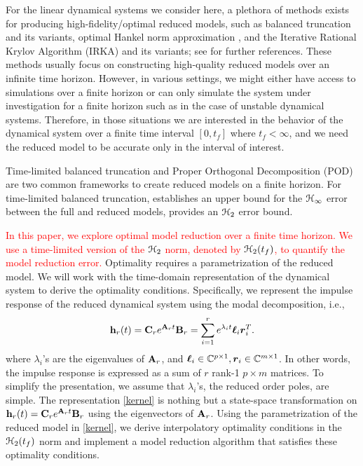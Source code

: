 \documentclass[twocolumn]{autart}
\begin{document}
For the linear dynamical systems we consider here, a plethora of methods exists
for producing high-fidelity/optimal reduced models, such as  balanced truncation \cite{MulR76,Moo81} and its variants, optimal Hankel norm approximation \cite{Glo84}, and the Iterative Rational Krylov Algorithm (IRKA) \cite{GugBA08} and its variants; see \cite{Ant05,BauBF14} for further references.
These methods usually focus on constructing high-quality reduced models  over an infinite time horizon. However, in various settings, we might either have access to simulations over a finite horizon or can only simulate the system under investigation for a finite horizon such as in the case of unstable dynamical systems. Therefore, in those situations we are interested in the behavior of the dynamical system over a finite time interval $[0,t_f]$ where $t_f < \infty$, and we need the reduced model to be accurate only in the interval of interest. 


Time-limited balanced truncation \cite{GawJ90,GugA03,RedK17,Kur17} and Proper Orthogonal Decomposition (POD)   \cite{HolLB96}  are two common frameworks to create reduced models on a finite horizon. 
For time-limited balanced truncation, \cite{GugA03} establishes an upper bound for the $\EuScript{H}_\infty$ error between the full and reduced models,  \cite{RedK17} provides an $\EuScript{H}_2$ error bound. 


  
\textcolor{red}{In this paper,  we explore optimal model reduction over a finite time horizon. We use a time-limited version of the $\EuScript{H}_2$ norm, denoted by $\EuScript{H}_2(t_f)$, to quantify the model reduction error.}
 Optimality requires a parametrization of the reduced model. We will work with the time-domain representation of the dynamical system to derive the optimality conditions. Specifically, we represent the impulse response of the reduced dynamical system using the modal decomposition, i.e.,
 \begin{equation}\label{kernel}
\begin{aligned}
\mathbf{h}_r(t)=\mathbf{C}_r e^{\mathbf{A}_r t}\mathbf{B}_r=\sum_{i=1}^r e^{\lambda_it}\boldsymbol{\ell}_i\boldsymbol{r}_i^T.
\end{aligned}
\end{equation}
where $\lambda_i$'s are the eigenvalues of $\mathbf{A}_r$, and $\boldsymbol{\ell}_i \in \mathbb{C}^{p\times 1}, \boldsymbol{r}_i\in \mathbb{C}^{m\times1}$. 
In other words, the impulse response is expressed as a sum of $r$ rank-1 $p\times m$  matrices.
To simplify the presentation,  we assume  that $\lambda_i$'s, the reduced order poles,  are simple.  The representation \eqref{kernel} 
is nothing but a state-space transformation on $\mathbf{h}_r(t)=\mathbf{C}_r e^{\mathbf{A}_r t}\mathbf{B}_r$ using the eigenvectors of $\mathbf{A}_r$. 
Using the parametrization of the reduced model in \eqref{kernel}, we derive interpolatory optimality conditions in the $\EuScript{H}_2(t_f)$ norm and implement a model reduction algorithm that satisfies these optimality conditions.
\end{document}
